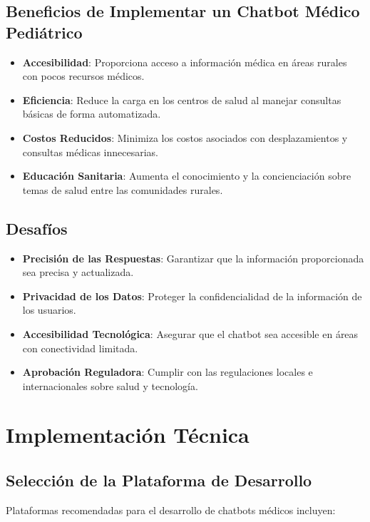 \subsection{Beneficios de Implementar un Chatbot Médico Pediátrico}

\begin{itemize}
    \item \textbf{Accesibilidad}: Proporciona acceso a información médica en áreas rurales con pocos recursos médicos.
    \item \textbf{Eficiencia}: Reduce la carga en los centros de salud al manejar consultas básicas de forma automatizada.
    \item \textbf{Costos Reducidos}: Minimiza los costos asociados con desplazamientos y consultas médicas innecesarias.
    \item \textbf{Educación Sanitaria}: Aumenta el conocimiento y la concienciación sobre temas de salud entre las comunidades rurales.
\end{itemize}

\subsection{Desafíos}

\begin{itemize}
    \item \textbf{Precisión de las Respuestas}: Garantizar que la información proporcionada sea precisa y actualizada.
    \item \textbf{Privacidad de los Datos}: Proteger la confidencialidad de la información de los usuarios.
    \item \textbf{Accesibilidad Tecnológica}: Asegurar que el chatbot sea accesible en áreas con conectividad limitada.
    \item \textbf{Aprobación Reguladora}: Cumplir con las regulaciones locales e internacionales sobre salud y tecnología.
\end{itemize}

\section{Implementación Técnica}

\subsection{Selección de la Plataforma de Desarrollo}

Plataformas recomendadas para el desarrollo de chatbots médicos incluyen:

